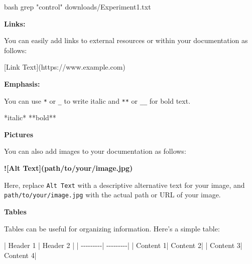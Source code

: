 \documentclass[
  letterpaper,
  DIV=11,
  numbers=noendperiod]{scrreprt}
\newenvironment{Shaded}{}{}
\newcommand{\AlertTok}[1]{\textcolor[rgb]{1.00,0.33,0.33}{\textbf{#1}}}
\newcommand{\CommentTok}[1]{\textcolor[rgb]{0.42,0.45,0.49}{#1}}
\newcommand{\FunctionTok}[1]{\textcolor[rgb]{0.44,0.26,0.76}{#1}}
\newcommand{\InformationTok}[1]{\textcolor[rgb]{0.42,0.45,0.49}{#1}}
\newcommand{\NormalTok}[1]{\textcolor[rgb]{0.14,0.16,0.18}{#1}}
\newcommand{\OtherTok}[1]{\textcolor[rgb]{0.44,0.26,0.76}{#1}}
\newcommand{\StringTok}[1]{\textcolor[rgb]{0.01,0.18,0.38}{#1}}
\begin{document}
\begin{Shaded}
\begin{Highlighting}[]
\InformationTok{\textasciigrave{}\textasciigrave{}\textasciigrave{}bash}
\FunctionTok{grep} \StringTok{"control"}\NormalTok{ downloads/Experiment1.txt}
\InformationTok{\textasciigrave{}\textasciigrave{}\textasciigrave{}}
\end{Highlighting}
\end{Shaded}

\textbf{Links:}

You can easily add links to external resources or within your
documentation as follows:

\begin{Shaded}
\begin{Highlighting}[]
\CommentTok{[}\OtherTok{Link Text}\CommentTok{](https://www.example.com)}
\end{Highlighting}
\end{Shaded}

\textbf{Emphasis:}

You can use \texttt{*} or \texttt{\_} to write italic and \texttt{**} or
\texttt{\_\_} for bold text.

\begin{Shaded}
\begin{Highlighting}[]
\NormalTok{*italic*}
\NormalTok{**bold**}
\end{Highlighting}
\end{Shaded}

\textbf{Pictures}

You can also add images to your documentation as follows:

\begin{Shaded}
\begin{Highlighting}[]
\AlertTok{![Alt Text](path/to/your/image.jpg)}
\end{Highlighting}
\end{Shaded}

Here, replace \texttt{Alt\ Text} with a descriptive alternative text for
your image, and \texttt{path/to/your/image.jpg} with the actual path or
URL of your image.

\textbf{Tables}

Tables can be useful for organizing information. Here's a simple table:

\begin{Shaded}
\begin{Highlighting}[]
\NormalTok{| Header 1 | Header 2 |}
\NormalTok{| {-}{-}{-}{-}{-}{-}{-}{-}{-}| {-}{-}{-}{-}{-}{-}{-}{-}{-}|}
\NormalTok{| Content 1| Content 2|}
\NormalTok{| Content 3| Content 4|}
\end{Highlighting}
\end{Shaded}
\end{document}
